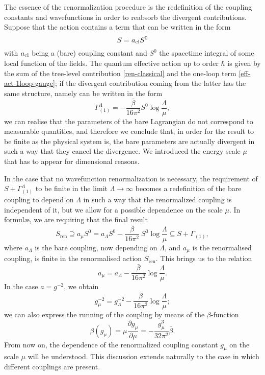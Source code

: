 The essence of the renormalization procedure is the redefinition of the coupling constants and wavefunctions in order to reabsorb the  divergent contributions.
Suppose that the action contains a term that can be written in the form
\begin{equation}\label{ren-classical}
S = a_{ \text{cl} } S^0
\end{equation}
with \(a_{ \text{cl} }\) being a (bare) coupling constant and $S^0$ the spacetime integral of some local function of the fields. %
The quantum effective action up to order $\hbar$ is given by the sum of the tree-level contribution \eqref{ren-classical} and the one-loop term \eqref{eff-act-1loop-gauge}; if the divergent contribution coming from the latter has the same structure, namely can be written in the form
\begin{equation}
\Gamma_{(1)}^\Lambda =  - \frac{ \bar \beta }{ 16 \pi^2 }  S^0 \log \frac{\Lambda}{\mu},
\end{equation}
we can realise that the parameters of the bare Lagrangian do not correspond to measurable quantities, and therefore we conclude that, in order for the result to be finite as the physical system is, the bare parameters are actually divergent in such a way that they cancel the divergence.  We introduced the energy scale $\mu$ that has to appear for dimensional reasons.


In the case that no wavefunction renormalization is necessary, the requirement of $S +\Gamma_{(1)}^\Lambda  $ to be finite in the limit $\Lambda \rightarrow \infty$ becomes a redefinition of the bare coupling to depend on \( \Lambda \) in such a way that the renormalized coupling is independent of it, but we allow for a possible dependence  on the scale \( \mu \). In formul\ae{}, we are requiring that the final result
\begin{equation}
S_{\text{ren}} \supseteq
a_\mu S^0 = a_\Lambda S^0 - \frac{ \bar \beta }{ 16 \pi^2 } \ S^0  \log \frac{\Lambda}{\mu}
\subseteq S + \Gamma_{(1)},
\end{equation}
where $a_\Lambda$ is the bare coupling, now depending on $\Lambda$, and $a_\mu$ is the renormalised coupling, is finite in the renormalised action $S_{\text{ren}} $.
This brings us to the relation
\begin{equation}\label{renorm-a}
a_\mu = a_\Lambda  - \frac{ \bar \beta }{ 16 \pi^2 } \log \frac{\Lambda}{\mu}.
\end{equation}
In the case \( a = g^{- 2 } \), we obtain
\begin{equation}\label{running-coupling}
g^{- 2 }_\mu = g^{- 2 }_\Lambda  - \frac{ \bar \beta }{ 16 \pi^2 } \log \frac{\Lambda}{\mu};
\end{equation}
we can also express the running of the coupling by means of the  $\beta$-function
\begin{equation}\label{beta-function-generic}
\beta(g_\mu) = \mu \frac{\partial g_\mu}{\partial \mu} = - \frac{g_\mu^3}{32 \pi^2} \bar \beta.
\end{equation}
From now on, the dependence of the renormalized coupling constant $g_\mu$ on the scale $\mu$ will be understood.
This discussion extends naturally to the case in which different couplings are present.

